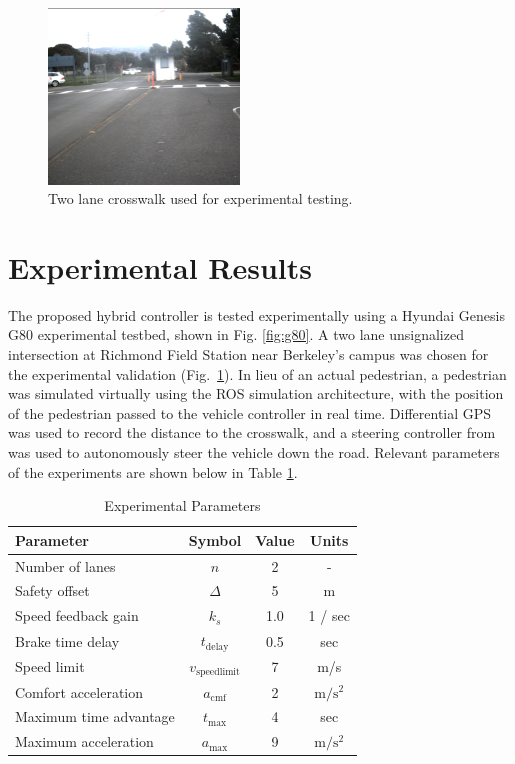 \documentclass[letterpaper, 10 pt, conference]{ieeeconf}  %
\begin{document}
\begin{figure}[h]
\centering
\includegraphics[width=2.0in]{figures/crosswalkPic.png}
\caption{Two lane crosswalk used for experimental testing.}
\label{fig:crosswalkpic}
\end{figure}


\section{Experimental Results}
\label{sec:expres}


The proposed hybrid controller is tested experimentally using a Hyundai Genesis G80 experimental testbed, shown in Fig. \ref{fig:g80}. A two lane unsignalized intersection at Richmond Field Station near Berkeley's campus was chosen for the experimental validation (Fig.~\ref{fig:crosswalkpic}).  In lieu of an actual pedestrian, a pedestrian was simulated virtually using the ROS simulation architecture, with the position of the pedestrian passed to the vehicle controller in real time. Differential GPS was used to record the distance to the crosswalk, and a steering controller from \cite{Kapania2015} was used to autonomously steer the vehicle down the road. Relevant parameters of the experiments are shown below in Table \ref{tb:expparams}.

\begin{table}[h]
\begin{center}
\caption{Experimental Parameters}\label{tb:expparams}
\begin{tabular}{lccc}
Parameter & Symbol & Value & Units \\\hline\hline
Number of lanes & $n$ & 2 & - \\
Safety offset   & $\Delta$ & 5 & m \\
Speed feedback gain & $k_s$ & 1.0 & 1 / sec\\
Brake time delay    & $t_\mathrm{delay}$ & 0.5 & sec \\ 
Speed limit & $v_\mathrm{speedlimit}$ & 7 & m/s \\
Comfort acceleration & $a_\mathrm{cmf}$ & 2 & $\mathrm{m/s^2}$ \\
Maximum time advantage & $t_\mathrm{max}$ & 4 & sec \\
Maximum acceleration & $a_\mathrm{max}$ & 9 & $\mathrm{m/s^2}$ \\\hline
\end{tabular}
\end{center}
\end{table}
\end{document}
